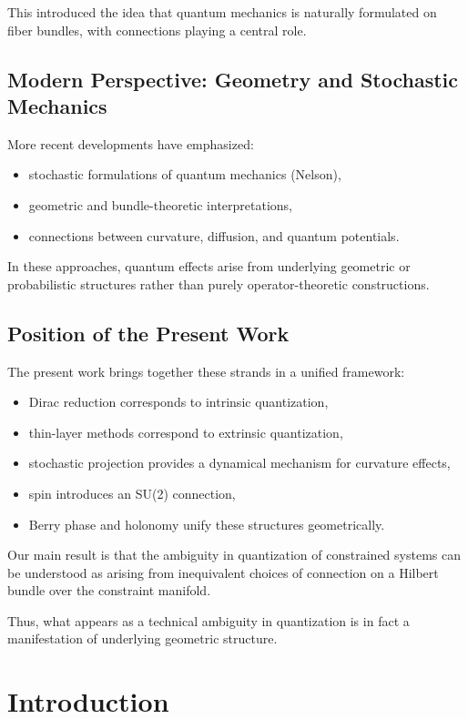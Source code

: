 \documentclass[11pt]{article}
\begin{document}
This introduced the idea that quantum mechanics is naturally formulated on fiber bundles, with connections playing a central role.

\subsection{Modern Perspective: Geometry and Stochastic Mechanics}

More recent developments have emphasized:

\begin{itemize}
\item stochastic formulations of quantum mechanics (Nelson),
\item geometric and bundle-theoretic interpretations,
\item connections between curvature, diffusion, and quantum potentials.
\end{itemize}

In these approaches, quantum effects arise from underlying geometric or probabilistic structures rather than purely operator-theoretic constructions.

\subsection{Position of the Present Work}

The present work brings together these strands in a unified framework:

\begin{itemize}
\item Dirac reduction corresponds to intrinsic quantization,
\item thin-layer methods correspond to extrinsic quantization,
\item stochastic projection provides a dynamical mechanism for curvature effects,
\item spin introduces an SU(2) connection,
\item Berry phase and holonomy unify these structures geometrically.
\end{itemize}

Our main result is that the ambiguity in quantization of constrained systems can be understood as arising from inequivalent choices of connection on a Hilbert bundle over the constraint manifold.

Thus, what appears as a technical ambiguity in quantization is in fact a manifestation of underlying geometric structure.


\section{Introduction}
\end{document}
